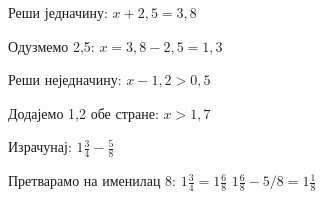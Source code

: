 \documentclass[11pt,a5paper,addpoints]{exam}
\begin{document}
\begin{questions}
\ifprintanswers\else\newpage\fi

\question[3]
Реши једначину: $x + 2,5 = 3,8$

\begin{solution}[\stretch 2]
Одузмемо 2,5: $x = 3,8 - 2,5 = 1,3$
\end{solution}

\question[3]
Реши неједначину: $x - 1,2 > 0,5$

\begin{solution}[\stretch 2]
Додајемо 1,2 обе стране: $x > 1,7$
\end{solution}

\question[3]
Израчунај: $1\frac{3}{4} - \frac{5}{8}$

\begin{solution}[\stretch 2]
Претварамо на именилац 8: $1\frac{3}{4}=1\frac{6}{8}$  
$1\frac{6}{8} - 5/8 = 1\frac{1}{8}$
\end{solution}

\end{questions}
\end{document}
